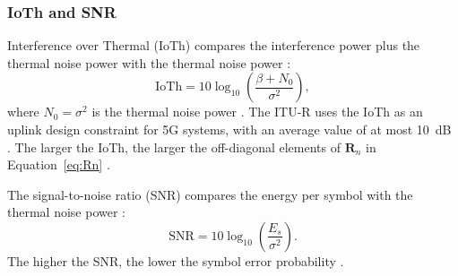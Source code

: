 \subsubsection{IoTh and SNR}\label{subsec:ioth}\label{subsec:snr}
Interference over Thermal (IoTh) compares the interference power plus the thermal noise power with the thermal noise power \cite{zhao2025jsac}:
\begin{equation}
\mathrm{IoTh}=10\log_{10}\left(\frac{\beta+N_0}{\sigma^2}\right),\label{eq:iot}
\end{equation}
where $N_0=\sigma^2$ is the thermal noise power \cite{zhao2021-globecom}. The ITU-R uses the IoTh as an uplink design constraint for 5G systems, with an average value of at most 10~dB \cite{itu-m2412}. The larger the IoTh, the larger the off-diagonal elements of $\mathbf R_n$ in Equation~\ref{eq:Rn} \cite{zhao2025jsac}.

The signal-to-noise ratio (SNR) compares the energy per symbol with the thermal noise power \cite{goldsmith}:
\begin{equation}
\mathrm{SNR}=10\log_{10}\left(\frac{E_s}{\sigma^2}\right).
\label{eq:snr}
\end{equation}
The higher the SNR, the lower the symbol error probability \cite{tse-viswanath}.

